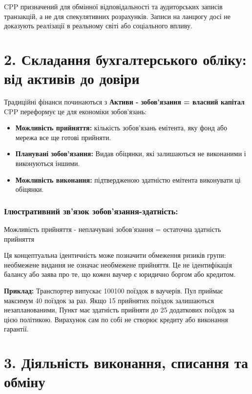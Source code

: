 \documentclass[11pt]{article}
\begin{document}
CPP призначений для обмінної відповідальності та аудиторських записів транзакцій, а не для спекулятивних розрахунків. Записи на ланцюгу досі не доказують реалізації в реальному світі або соціального впливу.


\section*{2. Складання бухгалтерського обліку: від активів до довіри}

Традиційні фінанси починаються з \textbf{Активи - зобов'язання = власний капітал} CPP переформує це для економіки зобов'язань:

\begin{itemize}[leftmargin=*]
\item \textbf{Можливість прийняття:} кількість зобов'язань емітента, яку фонд або мережа все ще готові прийняти.
\item \textbf{Планувані зобов'язання:} Видав обіцянки, які залишаються не виконаними і виконуються іншими.
\item \textbf{Можливість виконання:} підтвердженою здатністю емітента виконувати ці обіцянки.
\end{itemize}
\subsubsection*{Ілюстративний зв'язок зобов'язання-здатність:}

Можливість прийняття - неплачувані зобов'язання = остаточна здатність прийняття

Ця концептуальна ідентичність може позначити обмеження ризиків групи: необмежене видання не означає необмежене прийняття. Це не ідентифікація балансу або заява про те, що кожен ваучер є юридично боргом або кредитом.

\textbf{Приклад:} Транспортер випускає 100100 поїздок  в ваучерів. Пул приймає максимум 40 поїздок за раз. Якщо 15 прийнятих поїздок залишаються незапланованими, Пункт має здатність прийняти до 25 додаткових поїздок за цією політикою. Вирахунок сам по собі не створює кредиту або виконання гарантії.



\section*{3. Діяльність виконання, списання та обміну}
\end{document}
